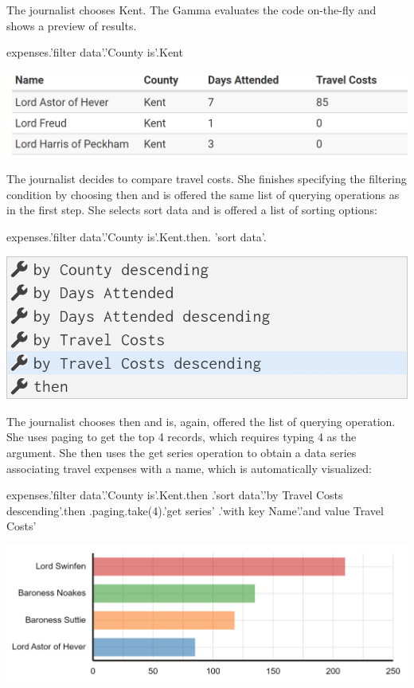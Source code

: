 \documentclass[conference]{IEEEtran}
\newcommand{\ikvd}[1]{{\fontfamily{zi4}\selectfont\small #1}}
\begin{document}
\noindent
The journalist chooses Kent. The Gamma evaluates the code on-the-fly and shows a
preview of results.

\vspace{0.5em}
\begin{thegamma}
expenses.'filter data'.'County is'.Kent
\end{thegamma}
\vspace{0.4em}\qquad\includegraphics[width=0.95\columnwidth]{figures/lords2}
\vspace{0.5em}

\noindent
The journalist decides to compare travel costs. She finishes specifying the
filtering condition by choosing \ikvd{then} and is offered the same list of querying operations as
in the first step. She selects  \ikvd{sort data} and is offered a list of sorting options:

\vspace{0.5em}
\begin{thegamma}
expenses.'filter data'.'County is'.Kent.then.
  'sort data'.
\end{thegamma}
\qquad\includegraphics[width=0.7\columnwidth]{figures/lords3}
\vspace{0.5em}

\noindent
The journalist chooses \ikvd{then} and is, again, offered the list of querying operation. She
uses \ikvd{paging} to get the top 4 records, which requires typing \ikvd{4} as the argument.
She then uses the \ikvd{get series} operation to obtain a data series associating travel
expenses with a name, which is automatically visualized:

\vspace{0.5em}
\begin{thegamma}
expenses.'filter data'.'County is'.Kent.then
  .'sort data'.'by Travel Costs descending'.then
  .paging.take(4).'get series'
    .'with key Name'.'and value Travel Costs'
\end{thegamma}
\vspace{0.2em}\quad\includegraphics[width=0.95\columnwidth]{figures/lords4}
\end{document}
